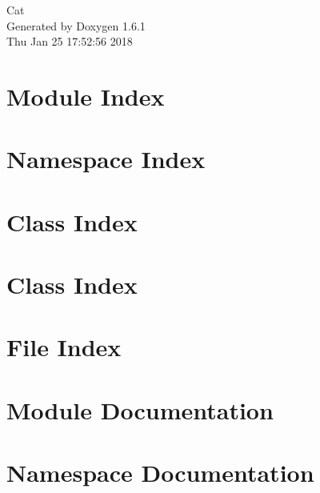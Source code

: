 \documentclass[a4paper]{book}
\begin{document}
\hypersetup{pageanchor=false}
\begin{titlepage}
\vspace*{7cm}
\begin{center}
{\Large Cat }\\
\vspace*{1cm}
{\large Generated by Doxygen 1.6.1}\\
\vspace*{0.5cm}
{\small Thu Jan 25 17:52:56 2018}\\
\end{center}
\end{titlepage}
\clearemptydoublepage
{}
\tableofcontents
\clearemptydoublepage
{}
\hypersetup{pageanchor=true}
\chapter{Module Index}

\chapter{Namespace Index}

\chapter{Class Index}

\chapter{Class Index}

\chapter{File Index}

\chapter{Module Documentation}

\chapter{Namespace Documentation}





































\end{document}

